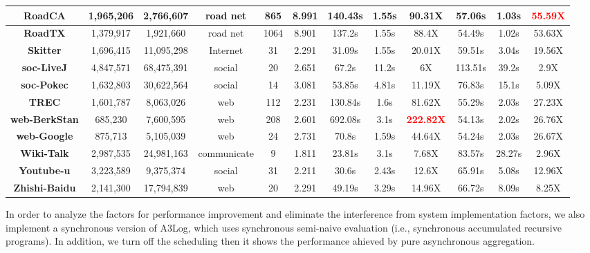 \documentclass{vldb}
\begin{document}
\begin{table}[!t]
\begin{tabular}{c|c|c|c|c|c|c|c|c|c|c|c}
		\hline
		\textbf{RoadCA} & 1,965,206 & 2,766,607 & road net & 865 & 8.991 & 140.43s & 1.55s & 90.31X & 57.06s & 1.03s & \textcolor{red}{\textbf{55.59X}} \\
		\hline
		\textbf{RoadTX} & 1,379,917 & 1,921,660 & road net & 1064 & 8.901 & 137.2s & 1.55s & 88.4X & 54.49s & 1.02s & 53.63X \\
		\hline
		\textbf{Skitter} & 1,696,415 & 11,095,298 & Internet & 31 & 2.291 & 31.09s & 1.55s & 20.01X & 59.51s & 3.04s & 19.56X \\
		\hline
		\textbf{soc-LiveJ} & 4,847,571 & 68,475,391 & social & 20 & 2.651 & 67.2s & 11.2s & 6X & 113.51s & 39.2s & 2.9X \\
		\hline
		\textbf{soc-Pokec} & 1,632,803 & 30,622,564 & social & 14 & 3.081 & 53.85s & 4.81s & 11.19X & 76.83s & 15.1s & 5.09X \\
		\hline
		\textbf{TREC} & 1,601,787 & 8,063,026 & web & 112 & 2.231 & 130.84s & 1.6s & 81.62X & 55.29s & 2.03s & 27.23X \\
		\hline
		\textbf{\footnotesize{web-BerkStan}} & 685,230 & 7,600,595 & web & 208 & 2.601 & 692.08s & 3.1s & \textcolor{red}{\textbf{222.82X}} & 54.13s & 2.02s & 26.76X \\
		\hline
		\textbf{web-Google} & 875,713 & 5,105,039 & web & 24 & 2.731 & 70.8s & 1.59s & 44.64X & 54.24s & 2.03s & 26.67X \\
		\hline
		\textbf{Wiki-Talk} & 2,987,535 & 24,981,163 & \footnotesize{communicate} & 9 & 1.811 & 23.81s & 3.1s & 7.68X & 83.57s & 28.27s & 2.96X \\
		\hline
		\textbf{Youtube-u} & 3,223,589  & 9,375,374 & social & 31 & 2.211 & 30.6s & 2.43s & 12.6X & 65.91s & 5.08s & 12.96X \\
		\hline
		\textbf{\footnotesize{Zhishi-Baidu}} & 2,141,300 & 17,794,839 & web & 20 & 2.291 & 49.19s & 3.29s & 14.96X & 66.72s & 8.09s & 8.25X\\
		\hline
	\end{tabular}
	\vspace{-0.1in}
\end{table}


In order to analyze the factors for performance improvement and eliminate the interference from system implementation factors, we also implement a synchronous version of A3Log, which uses synchronous semi-naive evaluation (i.e., synchronous accumulated recursive programs). In addition, we turn off the scheduling then it shows the performance ahieved by pure asynchronous aggregation.
\end{document}
